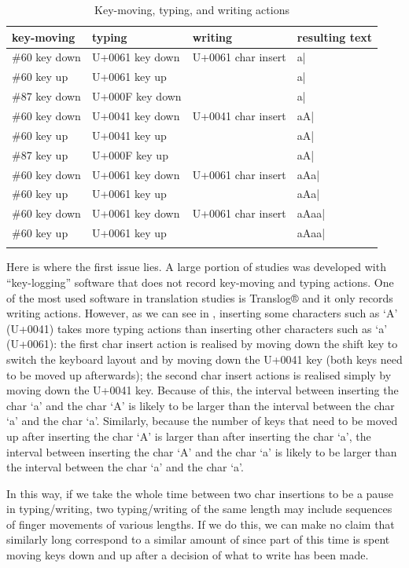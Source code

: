 \documentclass[output=paper]{LSP/langsci}
\begin{document}
\begin{table}%
\begin{tabular}{llll}
\lsptoprule
key-moving & typing & writing & resulting text \\
\midrule
\#60 key down & U+0061 key down & U+0061 char insert & a| \\
\hline
\#60 key up & U+0061 key up & & a| \\
\#87 key down & U+000F key down & & a| \\
\#60 key down & U+0041 key down & U+0041 char insert & aA| \\
\hline
\#60 key up & U+0041 key up & & aA| \\
\#87 key up & U+000F key up & & aA| \\
\#60 key down & U+0061 key down & U+0061 char insert & aAa| \\
\hline
\#60 key up & U+0061 key up & & aAa| \\
\#60 key down & U+0061 key down & U+0061 char insert & aAaa| \\
\hline
\#60 key up & U+0061 key up & & aAaa| \\
\lspbottomrule
\end{tabular}
\caption{Key-moving, typing, and writing actions}
\label{couto:tab:1}
\end{table}

Here is where the first issue lies. A large portion of  studies was developed with ``key-logging'' software that does not record key-moving and typing actions. One of the most used software in translation studies is Translog® and it only records writing actions. However, as we can see in , inserting some characters such as `A' (U+0041) takes more typing actions than inserting other characters such as `a' (U+0061): the first char insert action is realised by moving down the shift key to switch the keyboard layout and by moving down the U+0041 key (both keys need to be moved up afterwards); the second char insert actions is realised simply by moving down the U+0041 key. Because of this, the interval between inserting the char `a' and the char `A' is likely to be larger than the interval between the char `a' and the char `a'. Similarly, because the number of keys that need to be moved up after inserting the char `A' is larger than after inserting the char `a', the interval between inserting the char `A' and the char `a' is likely to be larger than the interval between the char `a' and the char `a'.

In this way, if we take the whole time between two char insertions to be a pause in typing/writing, two typing/writing  of the same length may include sequences of finger movements of various lengths. If we do this, we can make no claim that similarly long  correspond to a similar amount of  since part of this time is spent moving keys down and up after a decision of what to write has been made.
\end{document}
